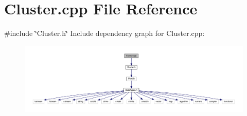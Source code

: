 \section{Cluster.\+cpp File Reference}
\label{_cluster_8cpp}
{\ttfamily \#include \char`\"{}Cluster.\+h\char`\"{}}\newline
Include dependency graph for Cluster.\+cpp\+:\nopagebreak
\begin{figure}[H]
\begin{center}
\leavevmode
\includegraphics[width=350pt]{_cluster_8cpp__incl}
\end{center}
\end{figure}
